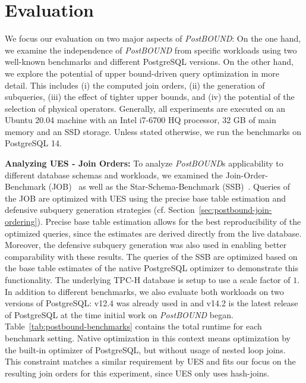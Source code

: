 \section{Evaluation}
\label{sec:Eval}

We focus our evaluation on two major aspects of \emph{PostBOUND}: On the one hand, we examine the independence of \emph{PostBOUND} from specific workloads using two well-known benchmarks and different PostgreSQL versions.
On the other hand, we explore the potential of upper bound-driven query optimization in more detail.
This includes (i) the computed join orders, (ii) the generation of subqueries, (iii) the effect of tighter upper bounds, and (iv) the potential of the selection of physical operators.
Generally, all experiments are executed on an Ubuntu 20.04 machine with an Intel i7-6700 HQ processor, 32 GB of main memory and an SSD storage.
Unless stated otherwise, we run the benchmarks on PostgreSQL 14.


\textbf{Analyzing UES - Join Orders:}
To analyze \emph{PostBOUND}s applicability to different database schemas and workloads, we examined the Join-Order-Benchmark (JOB)~\cite{DBLP:journals/pvldb/LeisGMBK015} as well as the Star-Schema-Benchmark (SSB)~\cite{DBLP:journals/corr/Sanchez16a}. 
Queries of the JOB are optimized with UES using the precise base table estimation and defensive subquery generation strategies (cf. Section~\ref{sec:postbound-join-ordering}). 
Precise base table estimation allows for the best reproducibility of the optimized queries, since the estimates are derived directly from the live database. 
Moreover, the defensive subquery generation was also used in \cite{hertzschuch-21-ues} enabling better comparability with these results. 
The queries of the SSB are optimized based on the base table estimates of the native PostgreSQL optimizer to demonstrate this functionality. 
The underlying TPC-H database is setup to use a scale factor of $1$. 
In addition to different benchmarks, we also evaluate both workloads on two versions of PostgreSQL: v12.4 was already used in \cite{hertzschuch-21-ues} and v14.2 is the latest release of PostgreSQL at the time initial work on \emph{PostBOUND} began. Table~\ref{tab:postbound-benchmarks} contains the total runtime for each benchmark setting. 
Native optimization in this context means optimization by the built-in optimizer of PostgreSQL, but without usage of nested loop joins.  
This constraint matches a similar requirement by UES and fits our focus on the resulting join orders for this experiment, since UES only uses hash-joins.

